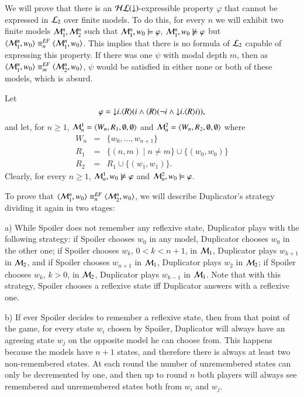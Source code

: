\begin{pf}
We will prove that there is an $\mathcal{HL}({\downarrow})$-expressible property $\varphi$ that cannot be expressed in $\mathcal{L}_2$ over finite models. To do this, for every $n$ we will exhibit two finite models $\mathcal{M}_1^n,\mathcal{M}_2^n$ such that $\mathcal{M}_1^n,w_0\models\varphi$, $\mathcal{M}_1^n,w_0\not\models\varphi$ but $\langle \mathcal{M}_1^n,w_0 \rangle\equiv^{\mathit{EF}}_n\langle \mathcal{M}_1^n,w_0 \rangle$. This implies that there is no formula of $\mathcal{L}_2$ capable of expressing this property. If there was one $\psi$ with modal depth $m$, then as $\langle \mathcal{M}_1^n,w_0 \rangle\equiv^{\mathit{EF}}_m\langle \mathcal{M}_2^n,w_0 \rangle$,  $\psi$ would be satisfied in either none or both of these models, which is absurd.

Let
\[
 \varphi =
{\downarrow} i. \langle R \rangle(i \land \langle R \rangle(\lnot i \land {\downarrow} i.
\langle R \rangle i)),
\]
and let, for $n\geq 1$, $\mathcal{M}^1_n = \langle W_n, R_1, \emptyset,
\emptyset \rangle$ and $\mathcal{M}^2_n = \langle W_n, R_2, \emptyset, \emptyset \rangle$
where
\begin{eqnarray*}
W_n&=&\{w_0, \dots, w_{n+1}\}\\
R_1&=&\{(n,m)\mid n \neq m\} \cup \{(w_0,w_0)\}\\
R_2&=&R_1 \cup \{(w_1, w_1)\}.
\end{eqnarray*}
%
Clearly, for every $n \geq 1$, $\mathcal{M}^1_n, w_0 \not\models \varphi$ and
$\mathcal{M}^2_n, w_0 \models \varphi$.

To prove that $\langle \mathcal{M}_1^n,w_0 \rangle\equiv^{\mathit{EF}}_n\langle \mathcal{M}_2^n,w_0 \rangle$, we will describe Duplicator's strategy dividing it again in two stages:
\smallskip

\noindent
a) While Spoiler does not remember any reflexive state,
Duplicator plays with the following strategy: if Spoiler chooses
$w_0$ in any model, Duplicator chooses $w_0$ in the other one; if
Spoiler chooses $w_k$, $0 < k < n+1$, in $\mathcal{M}_1$, Duplicator
plays $w_{k+1}$ in $\mathcal{M}_2$, and if Spoiler chooses $w_{n+1}$ in
$\mathcal{M}_1$, Duplicator plays $w_2$ in $\mathcal{M}_2$; if Spoiler chooses
$w_k$, $k > 0$, in $\mathcal{M}_2$, Duplicator plays $w_{k-1}$ in
$\mathcal{M}_1$. Note that with this strategy, Spoiler chooses a
reflexive state iff Duplicator answers with a reflexive one.

\noindent
b) If ever
Spoiler decides to remember a reflexive state, then from that point
of the game, for every state $w_i$ chosen by Spoiler, Duplicator
will always have an agreeing state $w_j$ on the opposite model he
can choose from. This happens because the models have $n+1$ states, and
therefore there is always at least two non-remembered states. At each round the number of unremembered states can only be decremented by one, and then up to round $n$ both players will always see remembered and unremembered states both from $w_i$ and $w_j$.
\end{pf}

